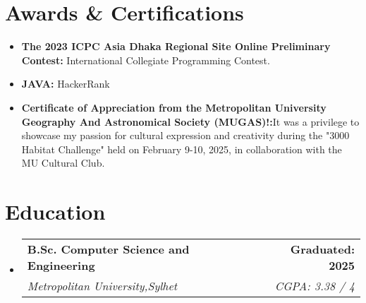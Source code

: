 \documentclass[letterpaper,11pt]{article}
\makeatletter
\newcommand{\resumeItem}[1]{\item\small{{#1 \vspace{-2pt}}}}
\newcommand{\resumeSubheading}[4]{
  \vspace{-2pt}\item
    \begin{tabular*}{1.0\textwidth}[t]{l@{\extracolsep{\fill}}r}
      \textbf{#1} & \textbf{\small #2} \\
      \textit{\small#3} & \textit{\small #4} \\
    \end{tabular*}\vspace{-6pt}
}
\newcommand{\resumeItemListStart}{\begin{itemize}}
\newcommand{\resumeItemListEnd}{\end{itemize}\vspace{-5pt}}
\newcommand{\resumeSubHeadingListStart}{\begin{itemize}[leftmargin=0.0in, label={}]}
\newcommand{\resumeSubHeadingListEnd}{\end{itemize}}
\makeatother
\begin{document}
\section{Awards \& Certifications}
\resumeItemListStart
  \resumeItem{\textbf{The 2023 ICPC Asia Dhaka Regional Site Online Preliminary Contest:}  International Collegiate Programming Contest.}
  \resumeItem{\textbf{JAVA:} HackerRank}
  \resumeItem{\textbf{Certificate of Appreciation from the Metropolitan University Geography And Astronomical Society (MUGAS)!:}It was a privilege to showcase my passion for cultural expression and creativity during the "3000 Habitat Challenge" held on February 9-10, 2025, in collaboration with the MU Cultural Club.}
\resumeItemListEnd

\section{Education}
\resumeSubHeadingListStart
  \resumeSubheading
    {B.Sc. Computer Science and Engineering}{Graduated: 2025}
    {Metropolitan University,Sylhet}{CGPA: 3.38 / 4}
\resumeSubHeadingListEnd
\end{document}
